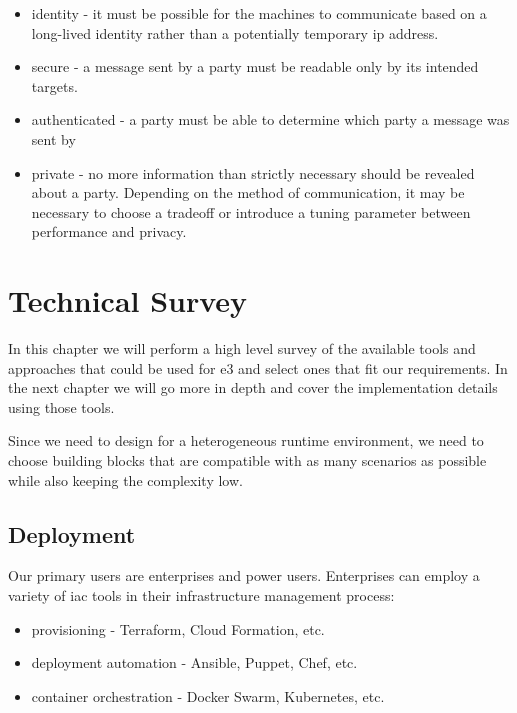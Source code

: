 \begin{itemize}
  \begin{itemize}
  \tightlist
  \item
    identity - it must be possible for the machines to communicate based
    on a long-lived identity rather than a potentially temporary
    \gls{ip} address.
  \item
    secure - a message sent by a party must be readable only by its
    intended targets.
  \item
    authenticated - a party must be able to determine which party a
    message was sent by
  \item
    private - no more information than strictly necessary should be
    revealed about a party. Depending on the method of communication, it
    may be necessary to choose a tradeoff or introduce a tuning
    parameter between performance and privacy.
  \end{itemize}
\end{itemize}

\hypertarget{technical-survey}{%
\chapter{Technical Survey}\label{technical-survey}}

In this chapter we will perform a high level survey of the available
tools and approaches that could be used for \gls{e3} and select ones
that fit our requirements. In the next chapter we will go more in depth
and cover the implementation details using those tools.

Since we need to design for a heterogeneous runtime environment, we need
to choose building blocks that are compatible with as many scenarios as
possible while also keeping the complexity low.

\hypertarget{deployment}{%
\section{Deployment}\label{deployment}}

Our primary users are enterprises and power users. Enterprises can
employ a variety of \gls{iac} tools in their infrastructure management
process:

\begin{itemize}
\tightlist
\item
  provisioning - Terraform\autocite{tfDocs}, Cloud
  Formation\autocite{cfDocs}, etc.
\item
  deployment automation - Ansible\autocite{ansibleDocs},
  Puppet\autocite{puppetDocs}, Chef\autocite{chefDocs}, etc.
\item
  container orchestration - Docker Swarm\autocite{dockerDocs},
  Kubernetes\autocite{kubeDocs}, etc.
\end{itemize}

